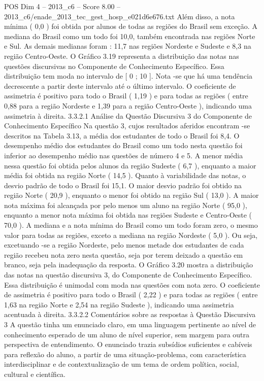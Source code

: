 \begin{textsample}{POS Dim 4 – 2013\_c6 – Score 8.00 – 2013\_c6/enade\_2013\_tec\_gest\_hosp\_e021d6e676.txt}
Além disso, a nota mínima ( 0,0 ) foi obtida por alunos de todas as regiões do Brasil sem exceção.
A mediana do Brasil como um todo foi 10,0, também encontrada nas regiões Norte e Sul.
As demais medianas foram : 11,7 nas regiões Nordeste e Sudeste e 8,3 na região Centro-Oeste.
O Gráfico 3.19 representa a distribuição das notas nas questões discursivas no Componente de Conhecimento Específico.
Essa distribuição tem moda no intervalo de [ 0 ; 10 ].
Nota -se que há uma tendência decrescente a partir deste intervalo até o último intervalo.
O coeficiente de assimetria é positivo para todo o Brasil ( 1,19 ) e para todas as regiões ( entre 0,88 para a região Nordeste e 1,39 para a região Centro-Oeste ), indicando uma assimetria à direita. 3.3.2.1 Análise da Questão Discursiva 3 do Componente de Conhecimento Específico Na questão 3, cujos resultados aferidos encontram -se descritos na Tabela 3.13, a média dos estudantes de todo o Brasil foi 8,4.
O desempenho médio dos estudantes do Brasil como um todo nesta questão foi inferior ao desempenho médio nas questões de número 4 e 5.
A menor média nessa questão foi obtida pelos alunos da região Sudeste ( 6,7 ), enquanto a maior média foi obtida na região Norte ( 14,5 ).
Quanto à variabilidade das notas, o desvio padrão de todo o Brasil foi 15,1.
O maior desvio padrão foi obtido na região Norte ( 20,9 ), enquanto o menor foi obtido na região Sul ( 13,0 ).
A maior nota máxima foi alcançada por pelo menos um aluno na região Norte ( 95,0 ), enquanto a menor nota máxima foi obtida nas regiões Sudeste e Centro-Oeste ( 70,0 ).
A mediana e a nota mínima do Brasil como um todo foram zero, o mesmo valor para todas as regiões, exceto a mediana na região Nordeste ( 5,0 ).
Ou seja, excetuando -se a região Nordeste, pelo menos metade dos estudantes de cada região recebeu nota zero nesta questão, seja por terem deixado a questão em branco, seja pela inadequação da resposta.
O Gráfico 3.20 mostra a distribuição das notas na questão discursiva 3, do Componente de Conhecimento Específico.
Essa distribuição é unimodal com moda nas questões com nota zero.
O coeficiente de assimetria é positivo para todo o Brasil ( 2,22 ) e para todas as regiões ( entre 1,63 na região Norte e 2,54 na região Sudeste ), indicando uma assimetria acentuada à direita. 3.3.2.2 Comentários sobre as respostas à Questão Discursiva 3 A questão tinha um enunciado claro, em uma linguagem pertinente ao nível de conhecimento esperado de um aluno de nível superior, sem margem para outra perspectiva de entendimento.
O enunciado trazia subsídios suficientes e cabíveis para reflexão do aluno, a partir de uma situação-problema, com característica interdisciplinar e de contextualização de um tema de ordem política, social, cultural e científica.

\end{textsample}
